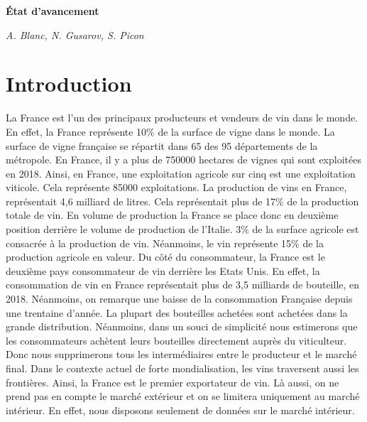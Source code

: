 \documentclass[11pt, a4paper]{article}
\begin{document}
\begin{center}
    \Large\textbf{État d'avancement}
    \par
    \large\textit{A. Blanc, N. Gusarov, S. Picon}
\end{center}


\section{Introduction}
La France est l’un des principaux producteurs et vendeurs de vin dans le monde. En effet, la France représente 10\% de la surface de vigne dans le monde. 
La surface de vigne française se répartit dans 65 des 95 départements de la métropole. 
En France, il y a plus de 750000 hectares de vignes qui sont exploitées en 2018. 
Ainsi, en France, une exploitation agricole sur cinq est une exploitation viticole. Cela représente 85000 exploitations. 
La production de vins en France, représentait 4,6 milliard de litres. 
Cela représentait plus de 17\% de la production totale de vin. 
En volume de production la France se place donc en deuxième position derrière  le volume de production de l’Italie. 
3\% de la surface agricole est consacrée à la production de vin. 
Néanmoins, le vin représente 15\% de la production agricole en valeur. 
Du côté du consommateur, la France est le deuxième pays consommateur de vin derrière les Etats Unis. 
En effet, la consommation de vin en France représentait plus de 3,5 milliards de bouteille, en 2018. 
Néanmoins, on remarque une baisse de la consommation Française depuis une trentaine d’année.
La plupart des bouteilles achetées sont achetées dans la grande distribution. 
Néanmoins, dans un souci de simplicité nous estimerons que les consommateurs achètent leurs bouteilles directement auprès du viticulteur. 
Donc nous supprimerons tous les intermédiaires entre le producteur et le marché final. 
Dans le contexte actuel de forte mondialisation, les vins traversent aussi les frontières. 
Ainsi, la France est le premier exportateur de vin.  
Là aussi, on ne prend pas en compte le marché extérieur et on se limitera uniquement au marché intérieur. 
En effet, nous disposons seulement de données sur le marché intérieur. 
\end{document}
